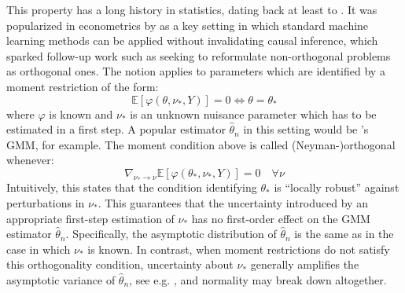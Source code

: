 \documentclass[12pt]{article}
\theoremstyle{myplain}
\theoremstyle{definition}
\theoremstyle{definition}
\theoremstyle{remark}
\numberwithin{equation}{section}
\begin{document}
This property has a long history in statistics, dating back at least to \cite{neyman1959}. It was popularized in econometrics by \cite{Chernozhukov2017DoubleDebiasedNeymanML} as a key setting in which standard machine learning methods can be applied without invalidating causal inference, which sparked follow-up work such as \cite{Chernozhukov2021AutomaticDM} seeking to reformulate non-orthogonal problems as orthogonal ones. The notion applies to parameters which are identified by a moment restriction of the form:
\begin{equation}\label{eq:momentrestriction}
    \mathbb{E}[\varphi(\theta, \nu_*, Y)]=0 \iff \theta=\theta_*
\end{equation}
where $\varphi$ is known and $\nu_*$ is an unknown nuisance parameter which has to be estimated in a first step. A popular estimator $\widehat{\theta}_n$ in this setting would be \cite{hansen1982gmm}'s GMM, for example. The moment condition above is called (Neyman-)orthogonal whenever:
\begin{equation}\label{eq:neyman}
    \nabla_{\nu_*\to\nu}\mathbb{E}[\varphi(\theta_*, \nu_*, Y)]=0 \quad \forall \nu
\end{equation}
Intuitively, this states that the condition identifying $\theta_*$ is ``locally robust'' against perturbations in $\nu_*$. This guarantees that the uncertainty introduced by an appropriate first-step estimation of $\nu_*$ has no first-order effect on the GMM estimator $\widehat{\theta}_n$. Specifically, the asymptotic distribution of $\widehat{\theta}_n$ is the same as in the case in which $\nu_*$ is known. In contrast, when moment restrictions do not satisfy this orthogonality condition, uncertainty about $\nu_*$ generally amplifies the asymptotic variance of $\widehat{\theta}_n$, see e.g. \cite{chenliao2015}, and normality may break down altogether.\\
\end{document}
